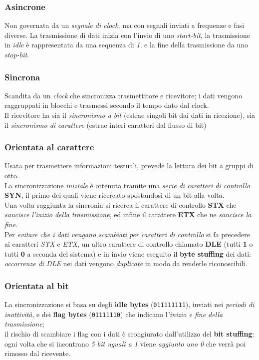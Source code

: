\documentclass[a4paper,11pt]{article}
\def\code#1{\texttt{#1}}
\begin{document}
\subsubsection{Asincrone}
Non governata da un \textit{segnale di clock}, ma con segnali inviati a frequenze e fasi diverse. La trasmissione di dati inizia con l'invio di uno \textit{start-bit}, la trasmissione in \textit{idle} è rappresentata da una sequenza di \textit{1}, e la fine della trasmissione da uno \textit{stop-bit}.
\subsubsection{Sincrona}
Scandita da un \textit{clock }che sincronizza trasmettitore e ricevitore; i dati vengono raggruppati in blocchi e trasmessi secondo il tempo dato dal clock.\\ Il ricevitore ha sia il \textit{sincronismo a bit} (estrae singoli bit dai dati in ricezione), sia il \textit{sincronismo di carattere} (estrae interi caratteri dal flusso di bit)
\subsubsection{Orientata al carattere}
Usata per trasmettere informazioni testuali, prevede la lettura dei bit a gruppi di otto. \\La sincronizzazione \textit{iniziale} è ottenuta tramite una \textit{serie di caratteri di controllo} \textbf{SYN}, il primo dei quali viene ricercato spostandosi di un bit alla volta.\\
Una volta raggiunta la sincronia si ricerca il carattere di controllo \textbf{STX }che \textit{sancisce l'inizio della trasmissione}, ed infine il carattere \textbf{ETX} che ne \textit{sancisce la fine}.\\ Per \textit{evitare che i dati vengano scambiati per caratteri di controllo }si fa precedere ai caratteri \textit{STX }e\textit{ ETX}, un altro carattere di controllo chiamato \textbf{DLE }(tutti \textbf{1 }o tutti \textbf{0 }a seconda del sistema) e in invio viene eseguito il \textbf{byte stuffing} dei dati: \textit{occorrenze di DLE }nei dati vengono \textit{duplicate }in modo da renderle riconoscibili.   
\subsubsection{Orientata al bit}
La sincronizzazione si basa su degli \textbf{idle bytes} (\code{011111111}), inviati nei \textit{periodi di inattività}, e dei \textbf{flag bytes} (\code{01111110}) che indicano l\textit{'inizio e fine della trasmissione};\\il rischio di scambiare i flag con i dati è scongiurato dall'utilizzo del \textbf{bit stuffing}: ogni volta che si incontrano \textit{5 bit uguali a 1} viene \textit{aggiunto uno 0 }che verrà poi rimosso dal ricevente.
\newpage
\end{document}
